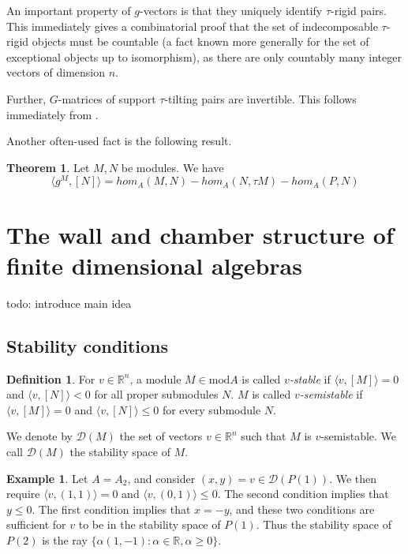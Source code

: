 \documentclass[]{article}
\theoremstyle{definition}
\newtheorem{definition}{Definition}[section]
\newtheorem{theorem}{Theorem}[section]
\newtheorem{example}{Example}[section]
\newcommand{\tu}{\ensuremath{\tau}}
\begin{document}
An important property of $g$-vectors is that they uniquely identify $\tau$-rigid pairs\cite[Theorem 5.5]{tau}. This immediately gives a combinatorial proof that the set of indecomposable \tu-rigid objects must be countable (a fact known more generally for the set of exceptional objects up to isomorphism), as there are only countably many integer vectors of dimension $n$. 

Further, $G$-matrices of support \tu-tilting pairs are invertible. This follows immediately from \cite[Theorem 5.1]{tau}.

Another often-used fact is the following result.

\begin{theorem}
	Let $M,N$ be modules. We have \[\langle g^M,[N]\rangle = hom_A(M,N) - hom_A(N,\tau M) - hom_A(P,N)\]
	
	
\end{theorem}

\section{The wall and chamber structure of finite dimensional algebras}

todo: introduce main idea

\subsection{Stability conditions}

\begin{definition}
	For $v \in \mathbb{R}^n$, a module $M \in \text{mod} A$ is called \textit{$v$-stable} if $\langle v,[M]\rangle = 0$ and $\langle v,[N]\rangle < 0$ for all proper submodules $N$. $M$ is called \textit{$v$-semistable} if $\langle v, [M]\rangle = 0$ and $\langle v, [N]\rangle \leq 0$ for every submodule $N$.
\end{definition}

We denote by $\mathcal{D}(M)$ the set of vectors $v \in \mathbb{R}^n$ such that $M$ is $v$-semistable. We call $\mathcal{D}(M)$ the stability space of $M$.

\begin{example}
	Let $A = A_2$, and consider $(x,y) = v \in \mathcal{D}(P(1))$. We then require $\langle v,(1,1)\rangle = 0$ and $\langle v,(0,1)\rangle \leq 0$. The second condition implies that $y \leq 0$. The first condition implies that $x = -y$, and these two conditions are sufficient for $v$ to be in the stability space of $P(1)$. Thus the stability space of $P(2)$ is the ray $\{\alpha(1,-1) :  \alpha \in \mathbb{R}, \alpha \geq 0\}$. 
\end{example}
\end{document}
